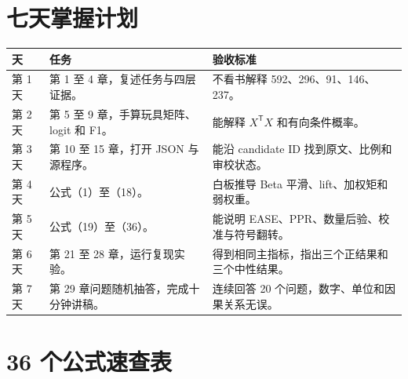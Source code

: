 \documentclass[UTF8,11pt,openany,fontset=none]{ctexbook}
\begin{document}
\chapter{七天掌握计划}

\begin{longtable}{p{}p{}p{}}
\toprule
天 & 任务 & 验收标准\\
\midrule
第 1 天 & 第 1 至 4 章，复述任务与四层证据。 & 不看书解释 592、296、91、146、237。\\
第 2 天 & 第 5 至 9 章，手算玩具矩阵、logit 和 F1。 & 能解释 $X^{\mathsf T}X$ 和有向条件概率。\\
第 3 天 & 第 10 至 15 章，打开 JSON 与源程序。 & 能沿 candidate ID 找到原文、比例和审校状态。\\
第 4 天 & 公式（1）至（18）。 & 白板推导 Beta 平滑、lift、加权矩和弱权重。\\
第 5 天 & 公式（19）至（36）。 & 能说明 EASE、PPR、数量后验、校准与符号翻转。\\
第 6 天 & 第 21 至 28 章，运行复现实验。 & 得到相同主指标，指出三个正结果和三个中性结果。\\
第 7 天 & 第 29 章问题随机抽答，完成十分钟讲稿。 & 连续回答 20 个问题，数字、单位和因果关系无误。\\
\bottomrule
\end{longtable}

\appendix

\chapter{36 个公式速查表}
\end{document}
